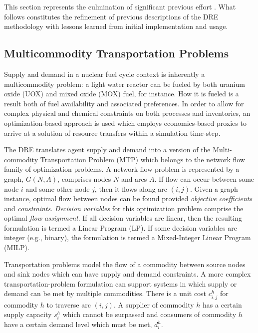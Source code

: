 This section represents the culmination of significant previous effort
\cite{gidden_agent-based_2013, gidden_agent-based_2014,
  gidden_agent-based_slc_2013}. What follows constitutes the refinement of
previous descriptions of the DRE methodology with lessons learned from initial
implementation and usage.

\subsection{Multicommodity Transportation Problems}\label{meth:mtp}

Supply and demand in a nuclear fuel cycle context is inherently a multicommodity
problem: a light water reactor can be fueled by both uranium oxide (UOX) 
and mixed oxide (MOX) fuel, for
instance. How it is fueled is a result both of fuel availability and associated
preferences. In order to allow for complex physical and chemical constraints on
both processes and inventories, an optimization-based approach is used which
employs economics-based proxies to arrive at a solution of resource transfers
within a simulation time-step.

The DRE translates agent supply and demand into a version of the Multi-commodity
Transportation Problem (MTP) \cite{even1975complexity} which belongs to the
network flow family of optimization problems. A network flow problem is
represented by a graph, $G(N, A)$, comprises nodes $N$ and arcs $A$. If flow
can occur between some node $i$ and some other node $j$, then it flows along arc
$(i, j)$. Given a graph instance, optimal flow between nodes can be found
provided \textit{objective coefficients} and
\textit{constraints}. \textit{Decision variables} for this optimization problem
comprise the optimal \textit{flow assignment}. If all decision variables are
linear, then the resulting formulation is termed a Linear Program (LP). If some
decision variables are integer (e.g., binary), the formulation is termed a
Mixed-Integer Linear Program (MILP).

Transportation problems model the flow of a commodity between source nodes and
sink nodes which can have supply and demand constraints. A more complex
transportation-problem formulation can support systems in which supply or demand
can be met by multiple commodities.  There is a unit cost $c_{i,j}^{h}$ for
commodity $h$ to traverse arc $(i,j)$. A supplier of commodity $h$ has a certain
supply capacity $s_i^h$ which cannot be surpassed and consumers of commodity $h$
have a certain demand level which must be met, $d_i^h$.

